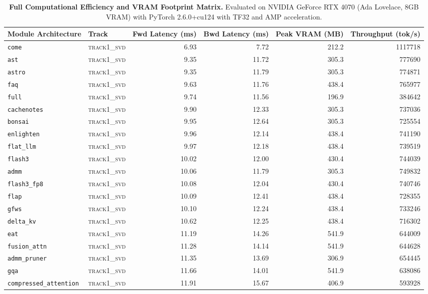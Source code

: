 \begin{table}[t]
\centering
\small
\caption{\textbf{Full Computational Efficiency and VRAM Footprint Matrix.} Evaluated on NVIDIA GeForce RTX 4070 (Ada Lovelace, 8GB VRAM) with PyTorch 2.6.0+cu124 with TF32 and AMP acceleration.}
\label{tab:efficiency_benchmark_results}
\begin{tabular}{l l r r r r}
\toprule
\textbf{Module Architecture} & \textbf{Track} & \textbf{Fwd Latency (ms)} & \textbf{Bwd Latency (ms)} & \textbf{Peak VRAM (MB)} & \textbf{Throughput (tok/s)} \\
\midrule
\texttt{come} & \textsc{track1\_svd} & 6.93 & 7.72 & 212.2 & 1117718 \\
\texttt{ast} & \textsc{track1\_svd} & 9.35 & 11.72 & 305.3 & 777690 \\
\texttt{astro} & \textsc{track1\_svd} & 9.35 & 11.79 & 305.3 & 774871 \\
\texttt{faq} & \textsc{track1\_svd} & 9.63 & 11.76 & 438.4 & 765977 \\
\texttt{full} & \textsc{track1\_svd} & 9.74 & 11.56 & 196.9 & 384642 \\
\texttt{cachenotes} & \textsc{track1\_svd} & 9.90 & 12.33 & 305.3 & 737036 \\
\texttt{bonsai} & \textsc{track1\_svd} & 9.95 & 12.64 & 305.3 & 725554 \\
\texttt{enlighten} & \textsc{track1\_svd} & 9.96 & 12.14 & 438.4 & 741190 \\
\texttt{flat\_llm} & \textsc{track1\_svd} & 9.97 & 12.18 & 438.4 & 739519 \\
\texttt{flash3} & \textsc{track1\_svd} & 10.02 & 12.00 & 430.4 & 744039 \\
\texttt{admm} & \textsc{track1\_svd} & 10.06 & 11.79 & 305.3 & 749832 \\
\texttt{flash3\_fp8} & \textsc{track1\_svd} & 10.08 & 12.04 & 430.4 & 740746 \\
\texttt{flap} & \textsc{track1\_svd} & 10.09 & 12.41 & 438.4 & 728355 \\
\texttt{gfws} & \textsc{track1\_svd} & 10.10 & 12.24 & 438.4 & 733246 \\
\texttt{delta\_kv} & \textsc{track1\_svd} & 10.62 & 12.25 & 438.4 & 716302 \\
\texttt{eat} & \textsc{track1\_svd} & 11.19 & 14.26 & 541.9 & 644009 \\
\texttt{fusion\_attn} & \textsc{track1\_svd} & 11.28 & 14.14 & 541.9 & 644628 \\
\texttt{admm\_pruner} & \textsc{track1\_svd} & 11.35 & 13.69 & 306.9 & 654445 \\
\texttt{gqa} & \textsc{track1\_svd} & 11.66 & 14.01 & 541.9 & 638086 \\
\texttt{compressed\_attention} & \textsc{track1\_svd} & 11.91 & 15.67 & 406.9 & 593928 \\
\bottomrule
\end{tabular}
\end{table}